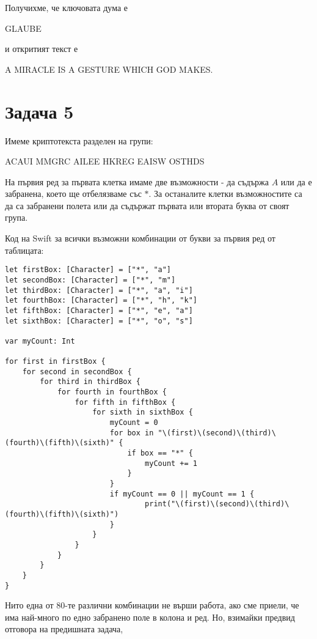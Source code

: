 \documentclass{article}
\begin{document}
\justify
Получихме, че ключовата дума е \\
\begin{center}
    GLAUBE \\
\end{center}
и откритият текст е \\
\begin{center}
    A MIRACLE IS A GESTURE WHICH GOD MAKES.
\end{center}

\section*{Задача 5}

\justify
Имеме криптотекста разделен на групи:
\begin{center}
ACAUI MMGRC AILEE HKREG EAISW OSTHDS
\end{center}
\justify
На първия ред за първата клетка имаме две възможности - да съдържа $A$ или да е забранена, което ще отбелязваме със $*$. За останалите клетки възможностите са да са забранени полета или да съдържат първата или втората буква от своят група. 

\justify
Код на Swift за всички възможни комбинации от букви за  първия ред от таблицата:

\begin{verbatim}
let firstBox: [Character] = ["*", "a"]
let secondBox: [Character] = ["*", "m"]
let thirdBox: [Character] = ["*", "a", "i"]
let fourthBox: [Character] = ["*", "h", "k"]
let fifthBox: [Character] = ["*", "e", "a"]
let sixthBox: [Character] = ["*", "o", "s"]

var myCount: Int

for first in firstBox {
    for second in secondBox {
        for third in thirdBox {
            for fourth in fourthBox {
                for fifth in fifthBox {
                    for sixth in sixthBox {
                        myCount = 0
                        for box in "\(first)\(second)\(third)\(fourth)\(fifth)\(sixth)" {
                            if box == "*" {
                                myCount += 1
                            }
                        }
                        if myCount == 0 || myCount == 1 {
                                print("\(first)\(second)\(third)\(fourth)\(fifth)\(sixth)")
                        }
                    }
                }
            }
        }
    }
}
\end{verbatim}

\justify
Нито една от 80-те различни комбинации не върши работа, ако сме приели, че има най-много по едно забранено поле в колона и ред. Но, взимайки предвид отговора на предишната задача,
\end{document}
